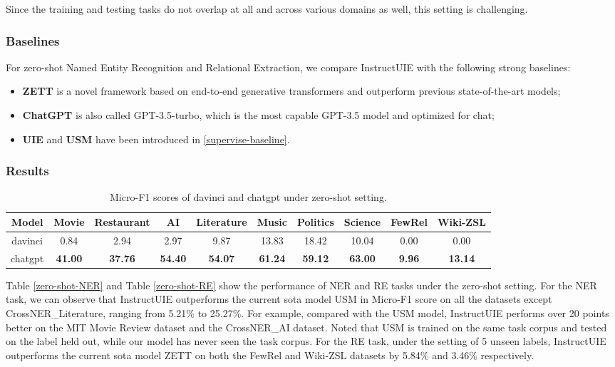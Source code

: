 Since the training and testing tasks do not overlap at all and across various domains as well, this setting is challenging.

\subsubsection{Baselines}
For zero-shot Named Entity Recognition and Relational Extraction, we compare InstructUIE with the following strong baselines:
\begin{itemize}
\item \textbf{ZETT}\cite{zett} is a novel framework based on end-to-end generative transformers and outperform previous state-of-the-art models;
\item \textbf{ChatGPT} \cite{InstructGPT} is also called GPT-3.5-turbo, which is the most capable GPT-3.5 model and optimized for chat;
\item \textbf{UIE} and \textbf{USM} have been introduced in \ref{supervise-baseline}.
\end{itemize}

\subsubsection{Results}

\begin{table*}[htbp]
    \centering
    \begin{tabular}{c|ccccccc|cc}
    \toprule
        Model & Movie & Restaurant & AI & Literature & Music & Politics & Science & FewRel & Wiki-ZSL \\
        \midrule
        davinci & 0.84 & 2.94 & 2.97 & 9.87 & 13.83 & 18.42 & 10.04 & 0.00 & 0.00 \\
        chatgpt & \textbf{41.00} & \textbf{37.76} & \textbf{54.40} & \textbf{54.07} & \textbf{61.24} & \textbf{59.12} & \textbf{63.00} & \textbf{9.96} & \textbf{13.14} \\
    \bottomrule
    \end{tabular}
    \caption{\label{zero-shot-GPT}
    Micro-F1 scores of davinci and chatgpt under zero-shot setting.}
\end{table*}

Table \ref{zero-shot-NER} and Table \ref{zero-shot-RE} show the performance of NER and RE tasks under the zero-shot setting. For the NER task, we can observe that InstructUIE outperforms the current sota model USM in Micro-F1 score on all the datasets except CrossNER\_Literature, ranging from 5.21\% to 25.27\%. For example, compared with the USM model, InstructUIE performs over 20 points better on the MIT Movie Review dataset and the CrossNER\_AI dataset. Noted that USM is trained on the same task corpus and tested on the label held out, while our model has never seen the task corpus. For the RE task, under the setting of 5 unseen labels, InstructUIE outperforms the current sota model ZETT on both the FewRel and Wiki-ZSL datasets by 5.84\% and 3.46\% respectively.

